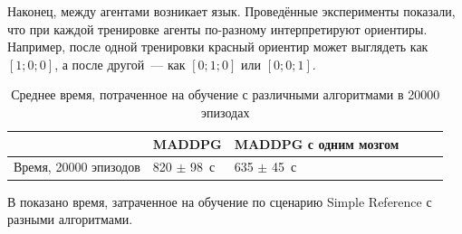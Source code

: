 Наконец, между агентами возникает язык. Проведённые эксперименты показали, что при каждой тренировке агенты по-разному интерпретируют ориентиры. Например, после одной тренировки красный ориентир может выглядеть как ${[1; 0; 0]}$, а после другой~--- как ${[0; 1; 0]}$ или ${[0; 0; 1]}$.

\begin{table}[t!]
    \centering\small
    \caption{Среднее время, потраченное на обучение с различными алгоритмами в 20000 эпизодах}
    \label{tab-sr-time}
    \begin{tabular}{|l|l|l|l|l|l|}
        \hline
        & MADDPG          & MADDPG с одним мозгом \\
        \hline
        Время, 20000 эпизодов & 820 $\pm$ 98~с & 635 $\pm$ 45~с       \\ \hline
    \end{tabular}
    \normalsize%
\end{table}

В  показано время, затраченное на обучение по сценарию Simple Reference с разными алгоритмами.

